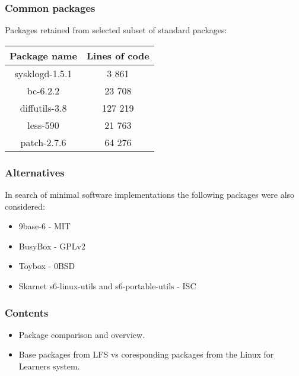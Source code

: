 \subsubsection{Common packages}

Packages retained from selected subset of standard packages:

\begin{center}
    \begin{tabular}{|c||c|}
        \hline
        Package name & Lines of code \\
        \hline
        \hline
        sysklogd-1.5.1 & 3 861 \\
        \hline
        bc-6.2.2 & 23 708 \\
        \hline        
        diffutils-3.8 & 127 219 \\
        \hline
        less-590 & 21 763 \\
        \hline
        patch-2.7.6 & 64 276 \\
        \hline
    \end{tabular}
\end{center}

\subsubsection{Alternatives}

In search of minimal software implementations the following packages were also considered:

\begin{itemize}
    \item 9base-6 \cite{9base} - MIT
    \item BusyBox \cite{busybox} - GPLv2
    \item Toybox \cite{toybox} - 0BSD
    \item Skarnet s6-linux-utils \cite{s6-linux} and s6-portable-utils \cite{s6-portable} - ISC
\end{itemize}

\subsubsection{Contents}

\begin{itemize}
    \item Package comparison and overview.
    \item Base packages from LFS vs coresponding packages from the Linux for Learners system.
\end{itemize}

